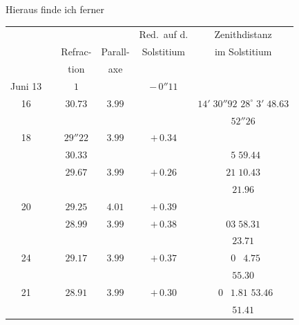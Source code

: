 \documentclass[12pt,a4paper]{article}
\begin{document}
\newpage

Hieraus finde ich ferner

\begin{center}
\small
\begin{tabular}{c|c|c|c|c|c}
\toprule
& & & & Red.~auf d. & Zenithdistanz \\
& & Refrac- & Parall- & Solstitium & im Solstitium \\
& & tion & axe & & \\
\midrule
Juni 13 & & $1$ & & $-\,0''11$ & \\
\phantom{13} 16 & & $30.73$ & $3.99$ & & $14'\;30''92$ \quad $28^{\circ}\;3'\;48.63$ \\
& & & & & \phantom{0}\phantom{0}\phantom{0}\phantom{0}\phantom{0}\phantom{0}\phantom{0}\phantom{0}\phantom{0}\phantom{0}\phantom{0}\phantom{0}\phantom{0}\phantom{0}\phantom{0}$52''26$ \\
\phantom{13} 18 & & $29''22$ & $3.99$ & $+\,0.34$ & \\
& & $30.33$ & & & $\phantom{0}5\;59.44$ \\
\phantom{13} & & $29.67$ & $3.99$ & $+\,0.26$ & $21\;10.43$ \\
& & & & & \phantom{0}\phantom{0}\phantom{0}\phantom{0}\phantom{0}\phantom{0}\phantom{0}\phantom{0}\phantom{0}\phantom{0}\phantom{0}\phantom{0}\phantom{0}\phantom{0}\phantom{0}$21.96$ \\
\phantom{13} 20 & & $29.25$ & $4.01$ & $+\,0.39$ & \\
\phantom{13} & & $28.99$ & $3.99$ & $+\,0.38$ & $03\;58.31$ \\
& & & & & \phantom{0}\phantom{0}\phantom{0}\phantom{0}\phantom{0}\phantom{0}\phantom{0}\phantom{0}\phantom{0}\phantom{0}\phantom{0}\phantom{0}\phantom{0}\phantom{0}\phantom{0}$23.71$ \\
\phantom{13} 24 & & $29.17$ & $3.99$ & $+\,0.37$ & $\phantom{0}0\;\phantom{0}4.75$ \\
\phantom{13} & & & & & \phantom{0}\phantom{0}\phantom{0}\phantom{0}\phantom{0}\phantom{0}\phantom{0}\phantom{0}\phantom{0}\phantom{0}\phantom{0}\phantom{0}\phantom{0}\phantom{0}\phantom{0}$55.30$ \\
\phantom{13} 21 & & $28.91$ & $3.99$ & $+\,0.30$ & $\phantom{0}0\;\phantom{0}1.81$ \quad $53.46$ \\
\phantom{13} & & & & & \phantom{0}\phantom{0}\phantom{0}\phantom{0}\phantom{0}\phantom{0}\phantom{0}\phantom{0}\phantom{0}\phantom{0}\phantom{0}\phantom{0}\phantom{0}\phantom{0}\phantom{0}$51.41$ \\

\end{tabular}
\end{center}
\end{document}
